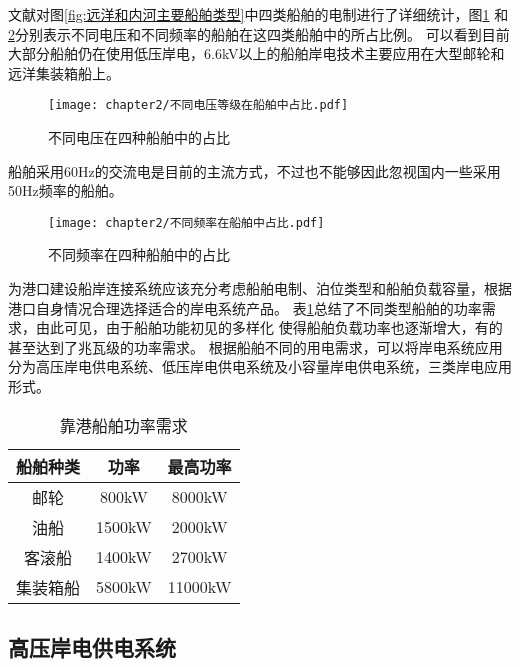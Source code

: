 文献\cite{SP6}对图\ref{fig:远洋和内河主要船舶类型}中四类船舶的电制进行了详细统计，图\ref{fig:不同电压在四种船舶中的占比}
和\ref{fig:不同频率在四种船舶中的占比}分别表示不同电压和不同频率的船舶在这四类船舶中的所占比例。
可以看到目前大部分船舶仍在使用低压岸电，6.6kV以上的船舶岸电技术主要应用在大型邮轮和远洋集装箱船上。

\begin{figure}[!htp]
	\centering
	\texttt{[image: chapter2/不同电压等级在船舶中占比.pdf]}
	\caption{不同电压在四种船舶中的占比}
	\label{fig:不同电压在四种船舶中的占比}
\end{figure}

船舶采用60Hz的交流电是目前的主流方式，不过也不能够因此忽视国内一些采用50Hz频率的船舶。

\begin{figure}[!htp]
	\centering
	\texttt{[image: chapter2/不同频率在船舶中占比.pdf]}
	\caption{不同频率在四种船舶中的占比}
	\label{fig:不同频率在四种船舶中的占比}
\end{figure}


为港口建设船岸连接系统应该充分考虑船舶电制、泊位类型和船舶负载容量，根据港口自身情况合理选择适合的岸电系统产品。
表\ref{tab:靠港船舶功率需求}总结了不同类型船舶的功率需求\cite{SP6}，由此可见，由于船舶功能初见的多样化
使得船舶负载功率也逐渐增大，有的甚至达到了兆瓦级的功率需求。
根据船舶不同的用电需求，可以将岸电系统应用分为高压岸电供电系统、低压岸电供电系统及小容量岸电供电系统，三类岸电应用形式。

\begin{table}[htbp]
	\centering
	\caption{靠港船舶功率需求}
	  \begin{tabular}{ccc}
	  \toprule
	  船舶种类  & 功率    & 最高功率 \\
	  \midrule
	  邮轮    & 800kW & 8000kW \\
	  油船    & 1500kW & 2000kW \\
	  客滚船   & 1400kW & 2700kW \\
	  集装箱船  & 5800kW & 11000kW \\
	  \bottomrule
	  \end{tabular}%
	\label{tab:靠港船舶功率需求}%
  \end{table}%
  

\subsection{高压岸电供电系统}

